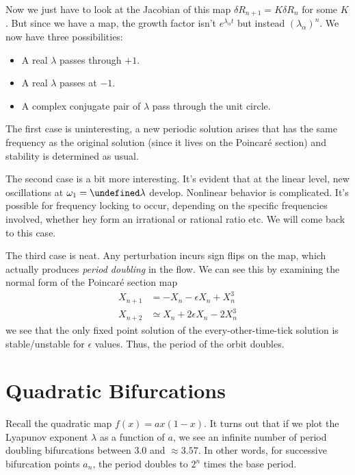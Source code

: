 \documentclass[10pt]{article}
\let\Im\undefined
\DeclareMathOperator{\Im}{Im}
\begin{document}
Now we just have to look at the Jacobian of this map
$\delta R_{n+1} = K \delta R_n$
for some $K$. But since we have a map, the growth factor isn't
$e^{\lambda_\alpha t}$ but instead $(\lambda_\alpha)^n$. We now have three
possibilities:
\begin{itemize}
    \item A real $\lambda$ passes through $+1$.
    \item A real $\lambda$ passes at $-1$.
    \item A complex conjugate pair of $\lambda$ pass through the unit circle.
\end{itemize}

The first case is uninteresting, a new periodic solution arises that has the
same frequency as the original solution (since it lives on the Poincar\'e
section) and stability is determined as usual.

The second case is a bit more interesting. It's evident that at the linear
level, new oscillations at $\omega_1 = \Im \lambda$ develop. Nonlinear behavior
is complicated. It's possible for frequency locking to occur, depending on the
specific frequencies involved, whether hey form an irrational or rational ratio
etc. We will come back to this case.

The third case is neat. Any perturbation incurs sign flips on the map, which
actually produces \emph{period doubling} in the flow. We can see this by
examining the normal form of the Poincar\'e section map
\begin{align}
    X_{n+1} &= -X_n - \epsilon X_n + X_n^3\\
    X_{n+2} &\simeq X_n + 2\epsilon X_n - 2X_n^3
\end{align}
we see that the only fixed point solution of the every-other-time-tick solution
is stable/unstable for $\epsilon$ values. Thus, the period of the orbit doubles.

\clearpage

\section{Quadratic Bifurcations}

Recall the quadratic map $f(x) = ax(1-x)$. It turns out that if we plot the
Lyapunov exponent $\lambda$ as a function of $a$, we see an infinite number of
period doubling bifurcations between $3.0$ and $\approx 3.57$. In other words,
for successive bifurcation points $a_n$, the period doubles to $2^n$ times the
base period.
\end{document}

